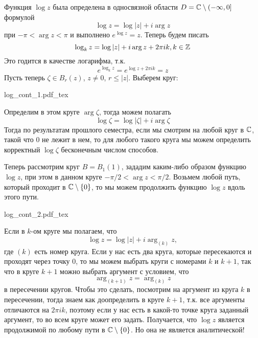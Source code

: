 \documentclass[main]{subfiles}
\begin{document}
\begin{example}
    Функция $\log z$ была определена в односвязной области $D = \mathbb{C} \setminus (- \infty,0]$ формулой
    \[\log z = \log |z| + i \arg z\]
    при $- \pi < \arg z < \pi$ и выполнено $e^{\log z} = z$.
    Теперь будем писать
    \[\log_k z = \log |z| + i \arg z + 2\pi i k, k \in \mathbb{Z}\]
    Это годится в качестве логарифма, т.к.
    \[e^{\log_k z} = e^{\log z + 2 \pi i k} = z\]
    Пусть теперь $\zeta \in B_r(z)$, $z \neq 0$, $ r \le |z|$.
    Выберем круг:
    \begin{center}
        {log_cont_1.pdf_tex}
    \end{center}
    Определим в этом круге $\arg \zeta$, тогда можем полагать
    \[\log \zeta = \log |\zeta| + i \arg \zeta\]
    Тогда по результатам прошлого семестра, если мы смотрим на любой круг в $\mathbb{C}$, такой что 0 не лежит в нем, то для любого такого круга мы можем определить корректный $\log \zeta$ бесконечным числом способов.

    Теперь рассмотрим круг $B = B_1(1)$, зададим каким-либо образом функцию $\log z$, при этом в данном круге $ - \pi/2 < \arg z < \pi /2$.
    Возьмем любой путь, который проходит в $\mathbb{C} \setminus \{0\}$, то мы можем продолжить функцию $\log z$ вдоль этого пути.
    \begin{center}
        \def\svgwidth{0.6\linewidth}
        {log_cont_2.pdf_tex}
    \end{center}
    Если в $k$-ом круге мы полагаем, что
    \[\log z = \log |z| + i \arg_{(k)} z,\]
    где $(k)$ есть номер круга.
    Если у нас есть два круга, которые пересекаются и проходят через точку $0$, то мы можем выбрать круги с номерами $k$ и $k+1$, так что в круге $k+1$ можно выбрать аргумент с условием, что
    \[\arg_{(k+1)} z = \arg_{(k)} z\]
    в пересечении кругов.
    Чтобы это сделать, посмотрим на аргумент из круга $k$ в пересечении, тогда знаем как доопределить в круге $k+1$, т.к. все аргументы отличаются на $2 \pi i k$, поэтому если у нас есть в какой-то точке круга заданный аргумент, то во всем круге может его задать.
    Получается, что $\log z$ является продолжимой по любому пути в $\mathbb{C} \setminus \{0\}$.
    Но она не является аналитической!


\end{example}
\end{document}
